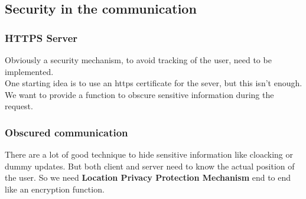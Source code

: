 \documentclass[../../main]{subfiles}
\begin{document}
\subsection{Security in the communication}
\label{ss:security-in-communication}

\subsubsection{HTTPS Server}
Obviously a security mechanism, to avoid tracking of the user, need to be implemented.\\
One starting idea is to use an https certificate for the sever, but this isn't enough.
We want to provide a function to obscure sensitive information during the request.
\subsubsection{Obscured communication}
There are a lot of good technique to hide sensitive information like cloacking or dummy updates.
But both client and server need to know the actual position of the user. So we need \textbf{Location Privacy Protection Mechanism} end to end like an 
encryption function.
\end{document}
